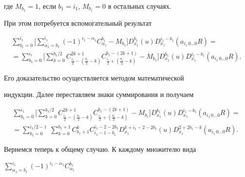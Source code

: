 где $M_{b_1}=1$, если $b_1=i_1$, $M_{b_1}=0$ в остальных случаях. 


 


При этом потребуется вспомогательный результат 


\begin{multline*} 


\sum^{i_1}_{b_1=0}\bigg[\sum^{i_1}_{\alpha_1=b_1} 


(-1)^{i_1-\alpha_1}C^{b_1}_{\alpha_1}-M_{b_1}\bigg] 


D^{b_1}_{x_1}(u)D^{i_1-b_1}_{x_1}(a_{i_1\,0\dotsc 0}R)=\\ 


% 


=\sum^{i_1}_{b_1=0}\bigg[\sum^{b_1/2}_{k=0} 


C^{2k+1}_{\frac{i_1}{2}-(\frac{b_1}{2}-k)} 


C^{b_1-(2k+1)}_{\frac{i_1}{2}+(\frac{b_1}{2}-k)}-M_{b_1}\bigg] 


D^{b_1}_{x_1}(u)D^{i_1-b_1}_{x_1}(a_{i_1\,0\dotsc 0}R). 


\end{multline*} 


Его доказательство осуществляется методом математической 


индукции. Далее переставляем знаки суммирования и получаем 


\begin{multline*} 


\sum^{i_1}_{b_1=0}\bigg[\sum^{b_1/2}_{k=0}


C^{2k+1}_{\frac{i_1}{2}-(\frac{b_1}{2}-k)} 


C^{b_1-(2k+1)}_{\frac{i_1}{2}+(\frac{b_1}{2}-k)}-M_{b_1}\bigg] 


D^{b_1}_{x_1}(u)D^{i_1-b_1}_{x_1}(a_{i_1\,0 \dotsc 0}R)=\\ 


%


=\sum^{i_1/2-1}_{b_1=0}\;\sum^{b_1+1}_{k=0}C^k_{b_1+1} 


C^{i_1-2-2b_1}_{i_1-1-b_1}D^{k+i_1-2-2b_1}_{x_1} 


(u)D^{2+2b_1-k}_{x_1}(a_{i_1\,0\dotsc 0}R). 


\end{multline*} 


 


Вернемся теперь к общему случаю. К каждому множителю вида 


$\sum\limits^{i_1}_{\alpha_1=b_1}(-1)^{i_1-\alpha_1}C^{b_1}_{\alpha_1}$ 


